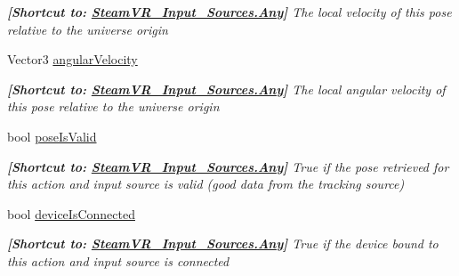 \begin{DoxyCompactItemize}
\begin{DoxyCompactList}\small\item\em {\bfseries{\mbox{[}Shortcut to\+: \mbox{\hyperlink{namespace_valve_1_1_v_r_a82e5bf501cc3aa155444ee3f0662853faed36a1ef76a59ee3f15180e0441188ad}{Steam\+V\+R\+\_\+\+Input\+\_\+\+Sources.\+Any}}\mbox{]}}} The local velocity of this pose relative to the universe origin \end{DoxyCompactList}\item 
Vector3 \mbox{\hyperlink{class_valve_1_1_v_r_1_1_steam_v_r___action___pose___base_a84bf81feaa02463f8151e1ea25e16825}{angular\+Velocity}}
\begin{DoxyCompactList}\small\item\em {\bfseries{\mbox{[}Shortcut to\+: \mbox{\hyperlink{namespace_valve_1_1_v_r_a82e5bf501cc3aa155444ee3f0662853faed36a1ef76a59ee3f15180e0441188ad}{Steam\+V\+R\+\_\+\+Input\+\_\+\+Sources.\+Any}}\mbox{]}}} The local angular velocity of this pose relative to the universe origin \end{DoxyCompactList}\item 
bool \mbox{\hyperlink{class_valve_1_1_v_r_1_1_steam_v_r___action___pose___base_af6eb7cf17442bd20ab60aad306b49240}{pose\+Is\+Valid}}
\begin{DoxyCompactList}\small\item\em {\bfseries{\mbox{[}Shortcut to\+: \mbox{\hyperlink{namespace_valve_1_1_v_r_a82e5bf501cc3aa155444ee3f0662853faed36a1ef76a59ee3f15180e0441188ad}{Steam\+V\+R\+\_\+\+Input\+\_\+\+Sources.\+Any}}\mbox{]}}} True if the pose retrieved for this action and input source is valid (good data from the tracking source) \end{DoxyCompactList}\item 
bool \mbox{\hyperlink{class_valve_1_1_v_r_1_1_steam_v_r___action___pose___base_a352107e49074a23f2ece4ec51f7cbc2d}{device\+Is\+Connected}}
\begin{DoxyCompactList}\small\item\em {\bfseries{\mbox{[}Shortcut to\+: \mbox{\hyperlink{namespace_valve_1_1_v_r_a82e5bf501cc3aa155444ee3f0662853faed36a1ef76a59ee3f15180e0441188ad}{Steam\+V\+R\+\_\+\+Input\+\_\+\+Sources.\+Any}}\mbox{]}}} True if the device bound to this action and input source is connected \end{DoxyCompactList}\item 

\end{DoxyCompactItemize}
